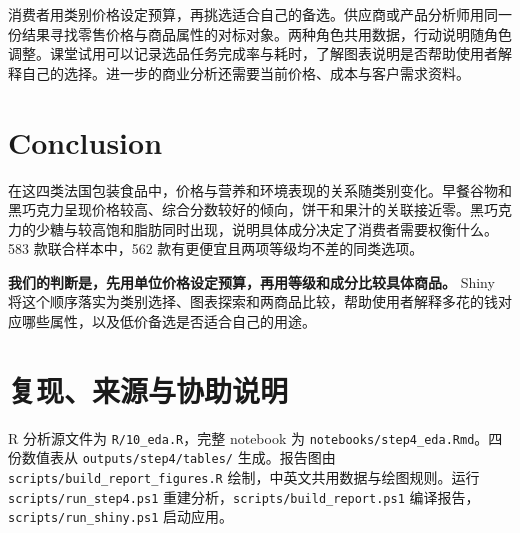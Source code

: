\documentclass[11pt,a4paper,onecolumn,oneside]{tau-class/tau}
\begin{document}
消费者用类别价格设定预算，再挑选适合自己的备选。供应商或产品分析师用同一份结果寻找零售价格与商品属性的对标对象。两种角色共用数据，行动说明随角色调整。课堂试用可以记录选品任务完成率与耗时，了解图表说明是否帮助使用者解释自己的选择。进一步的商业分析还需要当前价格、成本与客户需求资料。

\section{Conclusion}
在这四类法国包装食品中，价格与营养和环境表现的关系随类别变化。早餐谷物和黑巧克力呈现价格较高、综合分数较好的倾向，饼干和果汁的关联接近零。黑巧克力的少糖与较高饱和脂肪同时出现，说明具体成分决定了消费者需要权衡什么。583 款联合样本中，562 款有更便宜且两项等级均不差的同类选项。

\textbf{我们的判断是，先用单位价格设定预算，再用等级和成分比较具体商品。} Shiny 将这个顺序落实为类别选择、图表探索和两商品比较，帮助使用者解释多花的钱对应哪些属性，以及低价备选是否适合自己的用途。

\appendix
\section{复现、来源与协助说明}
R 分析源文件为 \nolinkurl{R/10_eda.R}，完整 notebook 为 \nolinkurl{notebooks/step4_eda.Rmd}。四份数值表从 \nolinkurl{outputs/step4/tables/} 生成。报告图由 \nolinkurl{scripts/build_report_figures.R} 绘制，中英文共用数据与绘图规则。运行 \nolinkurl{scripts/run_step4.ps1} 重建分析，\nolinkurl{scripts/build_report.ps1} 编译报告，\nolinkurl{scripts/run_shiny.ps1} 启动应用。
\end{document}
